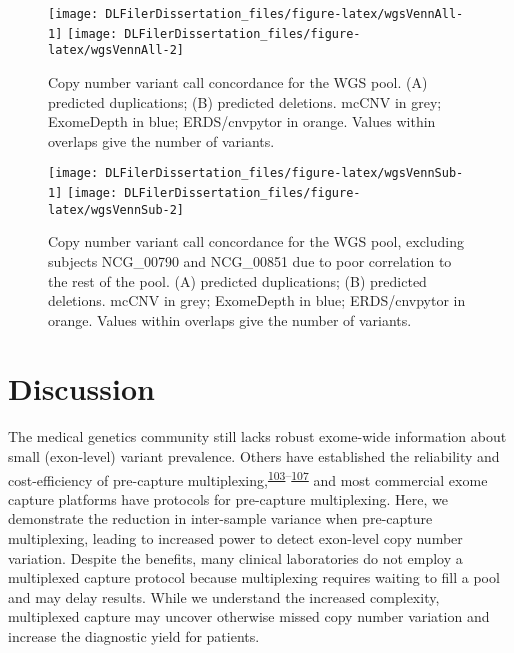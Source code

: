\documentclass[11pt,letterpaper,oneside]{book}
\begin{document}
\begin{figure}

{\centering \texttt{[image: DLFilerDissertation\_files/figure-latex/wgsVennAll-1]} \texttt{[image: DLFilerDissertation\_files/figure-latex/wgsVennAll-2]} 

}

\caption[Copy number variant call concordance for the WGS pool.]{Copy number variant call concordance for the WGS pool. (A) predicted duplications; (B) predicted deletions. mcCNV in grey; ExomeDepth in blue; ERDS/cnvpytor in orange. Values within overlaps give the number of variants.}\label{fig:wgsVennAll}
\end{figure}



\begin{figure}

{\centering \texttt{[image: DLFilerDissertation\_files/figure-latex/wgsVennSub-1]} \texttt{[image: DLFilerDissertation\_files/figure-latex/wgsVennSub-2]} 

}

\caption[Copy number variant call concordance for the WGS pool, excluding subjects NCG\_00790 and NCG\_00851 due to poor correlation to the rest of the pool.]{Copy number variant call concordance for the WGS pool, excluding subjects NCG\_00790 and NCG\_00851 due to poor correlation to the rest of the pool. (A) predicted duplications; (B) predicted deletions. mcCNV in grey; ExomeDepth in blue; ERDS/cnvpytor in orange. Values within overlaps give the number of variants.}\label{fig:wgsVennSub}
\end{figure}

\hypertarget{discussion}{%
\section{Discussion}\label{discussion}}

The medical genetics community still lacks robust exome-wide information about small (exon-level) variant prevalence.
Others have established the reliability and cost-efficiency of pre-capture multiplexing,\textsuperscript{\protect\hyperlink{ref-neiman:2012aa}{103}--\protect\hyperlink{ref-shearer:2012aa}{107}} and most commercial exome capture platforms have protocols for pre-capture multiplexing.
Here, we demonstrate the reduction in inter-sample variance when pre-capture multiplexing, leading to increased power to detect exon-level copy number variation.
Despite the benefits, many clinical laboratories do not employ a multiplexed capture protocol because multiplexing requires waiting to fill a pool and may delay results.
While we understand the increased complexity, multiplexed capture may uncover otherwise missed copy number variation and increase the diagnostic yield for patients.
\end{document}
